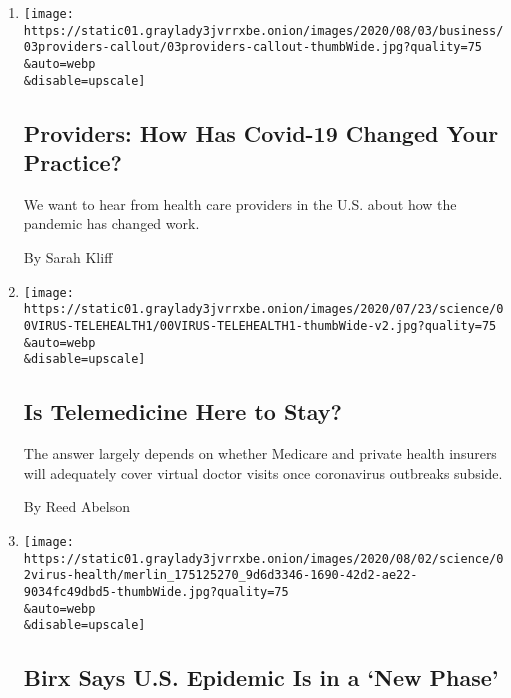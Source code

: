 \begin{enumerate}
\def\labelenumi{\arabic{enumi}.}
\item
  \href{/2020/08/03/reader-center/healthcare-workers-coronavirus-care.html}{}

  \texttt{[image: https://static01.graylady3jvrrxbe.onion/images/2020/08/03/business/03providers-callout/03providers-callout-thumbWide.jpg?quality=75\\\&auto=webp\\\&disable=upscale]}

  \hypertarget{providers-how-has-covid-19-changed-your-practice}{%
  \subsection{Providers: How Has Covid-19 Changed Your
  Practice?}\label{providers-how-has-covid-19-changed-your-practice}}

  We want to hear from health care providers in the U.S. about how the
  pandemic has changed work.

  By Sarah Kliff
\item
  \href{/2020/08/03/health/covid-telemedicine-congress.html}{}

  \texttt{[image: https://static01.graylady3jvrrxbe.onion/images/2020/07/23/science/00VIRUS-TELEHEALTH1/00VIRUS-TELEHEALTH1-thumbWide-v2.jpg?quality=75\\\&auto=webp\\\&disable=upscale]}

  \hypertarget{is-telemedicine-here-to-stay}{%
  \subsection{Is Telemedicine Here to
  Stay?}\label{is-telemedicine-here-to-stay}}

  The answer largely depends on whether Medicare and private health
  insurers will adequately cover virtual doctor visits once coronavirus
  outbreaks subside.

  By Reed Abelson
\item
  \href{/2020/08/02/health/dr-birx-coronavirus-phase.html}{}

  \texttt{[image: https://static01.graylady3jvrrxbe.onion/images/2020/08/02/science/02virus-health/merlin\_175125270\_9d6d3346-1690-42d2-ae22-9034fc49dbd5-thumbWide.jpg?quality=75\\\&auto=webp\\\&disable=upscale]}

  \hypertarget{birx-says-us-epidemic-is-in-a-new-phase}{%
  \subsection{Birx Says U.S. Epidemic Is in a `New
  Phase'}\label{birx-says-us-epidemic-is-in-a-new-phase}}


\end{enumerate}
